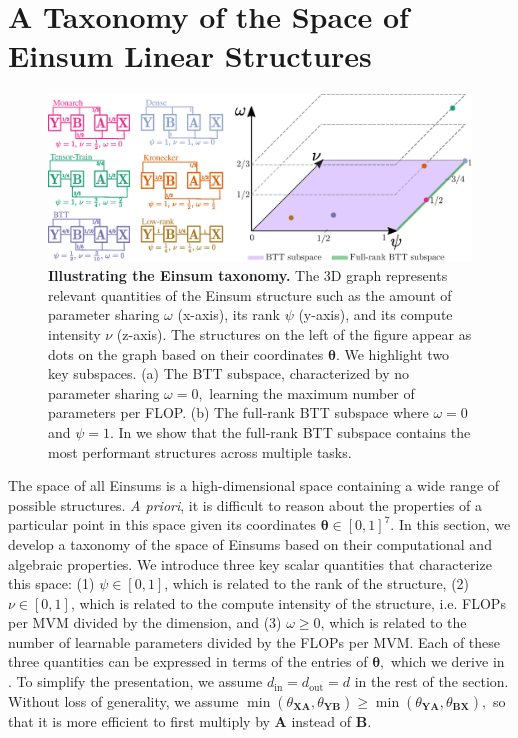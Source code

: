 \documentclass{article}
\newcommand{\mbf}[1]{{\boldsymbol{\mathbf{#1}}}}
\newcommand{\bm}{\mbf}
\newcommand{\din}{{d_\mathrm{in}}}
\newcommand{\dout}{{d_\mathrm{out}}}
\begin{document}
\section{A Taxonomy of the Space of Einsum Linear Structures}\label{sec:taxonomy}

\begin{figure}[!t]
\centering
    \includegraphics[width=0.8\linewidth]{figs/3d_v2.eps}
   \caption{
   \textbf{Illustrating the Einsum taxonomy.}
   The 3D graph represents relevant quantities of the Einsum structure such as the amount of parameter sharing $\omega$ (x-axis),
   its rank $\psi$ (y-axis), and its compute intensity $\nu$ (z-axis).
   The structures on the left of the figure appear as dots on the graph based on their coordinates $\bm{\theta}$.
   We highlight two key subspaces.
   (a) The BTT subspace, characterized by no parameter sharing $\omega=0,$ learning the maximum number of parameters per FLOP.
   (b) The full-rank BTT subspace where $\omega=0$ and $\psi=1$.
   In  we show that the full-rank BTT subspace contains the most performant structures across multiple tasks.
   }
    \label{fig:taxonomy}
    \vspace{-6mm}
\end{figure}

The space of all Einsums is a high-dimensional space containing a wide range of possible structures.
\emph{A priori}, it is difficult to reason about the properties of a particular point in this space given its coordinates $\bm{\theta} \in [0,1]^{7}$.
In this section, we develop a taxonomy of the space of Einsums based on their computational and algebraic properties.
We introduce three key scalar quantities that characterize this space:
(1) $\psi \in [0, 1]$, which is related to the rank of the structure,
(2) $\nu \in [0, 1]$, which is related to the compute intensity of the structure, i.e. FLOPs per MVM divided by the dimension, and
(3) $\omega \geq0$, which is related to the number of learnable parameters divided by the FLOPs per MVM.
Each of these three quantities can be expressed in terms of the entries of $\bm{\theta},$ which we derive in . To simplify the presentation, we assume $\din = \dout = d$ in the rest of the section. Without loss of generality, we assume $\min(\theta_{\bm{XA}}, \theta_\bm{YB}) \geq \min(\theta_{\bm{YA}}, \theta_{\bm{BX}}),$ so that it is more efficient to first multiply by $\bm{A}$ instead of $\bm{B}.$
\end{document}
